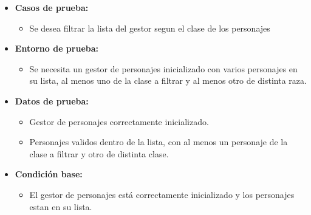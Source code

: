 \documentclass{article}
\begin{document}
\begin{itemize}
	\item \textbf{Casos de prueba:}
	\begin{itemize}
		\item Se desea filtrar la lista del gestor segun el clase de los personajes
	\end{itemize}
	
	\item \textbf{Entorno de prueba:}
	\begin{itemize}
		\item Se necesita un gestor de personajes inicializado con varios personajes en su lista, al menos uno de la clase a filtrar y al menos otro de distinta raza.
	\end{itemize}
	
	\item \textbf{Datos de prueba:}
	\begin{itemize}
		\item Gestor de personajes correctamente inicializado.
		\item Personajes validos dentro de la lista, con al menos un personaje de la clase a filtrar y otro de distinta clase.
	\end{itemize}
	
	\item \textbf{Condición base:}
	\begin{itemize}
		\item El gestor de personajes está correctamente inicializado y los personajes estan en su lista.
	\end{itemize}
	
\end{itemize}

\newpage
\end{document}
